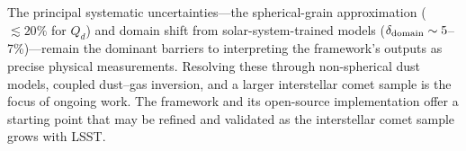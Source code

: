 \documentclass[preprint2]{aastex631}
\begin{document}
The principal systematic uncertainties---the spherical-grain approximation ($\lesssim 20\%$ for $Q_d$) and domain shift from solar-system-trained models ($\delta_{\rm domain} \sim 5$--7\%)---remain the dominant barriers to interpreting the framework's outputs as precise physical measurements. Resolving these through non-spherical dust models, coupled dust--gas inversion, and a larger interstellar comet sample is the focus of ongoing work. The framework and its open-source implementation offer a starting point that may be refined and validated as the interstellar comet sample grows with LSST.

%


\end{document}
